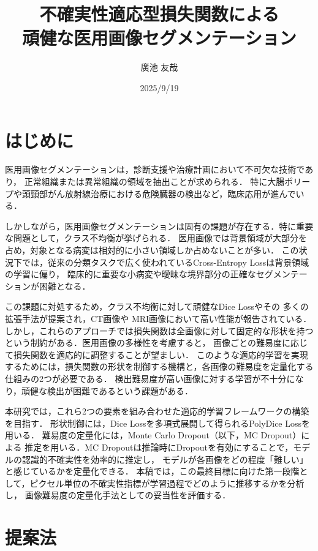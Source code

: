 \documentclass[10pt, a4paper, twocolumn]{jarticle}
\title{不確実性適応型損失関数による \\
頑健な医用画像セグメンテーション}
\author{廣池 友哉}
\affiliation{広島大学 大学院先進理工系科学研究科 情報科学プログラム}
\date{2025/9/19}
\begin{document}
\maketitle


\section{はじめに}
医用画像セグメンテーションは，診断支援や治療計画において不可欠な技術であり，
正常組織または異常組織の領域を抽出ことが求められる．
特に大腸ポリープ\cite{ji2022video}や頭頸部がん放射線治療における危険臓器\cite{maleki2020machine}の検出など，臨床応用が進んでいる．

しかしながら，医用画像セグメンテーションは固有の課題が存在する．特に重要な問題として，クラス不均衡が挙げられる．
医用画像では背景領域が大部分を占め，対象となる病変は相対的に小さい領域しか占めないことが多い．
この状況下では，従来の分類タスクで広く使われているCross-Entropy Loss\cite{long2015fully}は背景領域の学習に偏り，
臨床的に重要な小病変や曖昧な境界部分の正確なセグメンテーションが困難となる．

この課題に対処するため，クラス不均衡に対して頑健なDice Loss\cite{milletari2016v}やその
多くの拡張手法が提案され，CT画像\cite{zhu2019anatomynet, 9109297}や
MRI画像\cite{KATO2024107695}において高い性能が報告されている．
しかし，これらのアプローチでは損失関数は全画像に対して固定的な形状を持つという制約がある．医用画像の多様性を考慮すると，
画像ごとの難易度に応じて損失関数を適応的に調整することが望ましい．
このような適応的学習を実現するためには，損失関数の形状を制御する機構と，各画像の難易度を定量化する仕組みの2つが必要である．
検出難易度が高い画像に対する学習が不十分になり，頑健な検出が困難であるという課題がある．

本研究では，これら2つの要素を組み合わせた適応的学習フレームワークの構築を目指す．
形状制御には，Dice Lossを多項式展開して得られるPolyDice Lossを用いる．
難易度の定量化には，Monte Carlo Dropout\cite{pmlr-v48-gal16}（以下，MC Dropout）による
推定を用いる．MC Dropoutは推論時にDropoutを有効にすることで，モデルの認識的不確実性を効率的に推定し，
モデルが各画像をどの程度「難しい」と感じているかを定量化できる．
本稿では，この最終目標に向けた第一段階として，ピクセル単位の不確実性指標が学習過程でどのように推移するかを分析し，
画像難易度の定量化手法としての妥当性を評価する．
\section{提案法}
\end{document}
